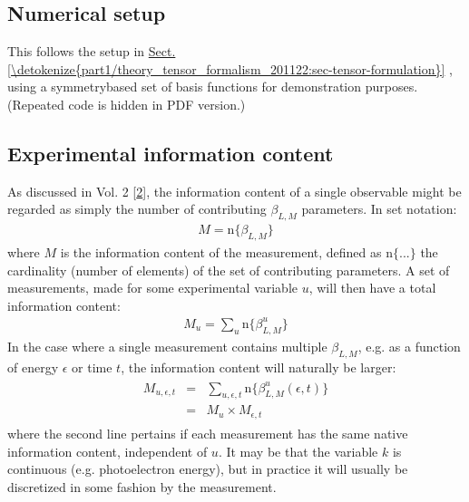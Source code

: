 \documentclass[letterpaper,table,10pt,english]{jupyterBook}
\begin{document}
\subsection{Numerical setup}
\label{\detokenize{part1/theory_info_content_221122:numerical-setup}}
\sphinxAtStartPar
This follows the setup in \hyperref[\detokenize{part1/theory_tensor_formalism_201122:sec-tensor-formulation}]{Sect.\@ \ref{\detokenize{part1/theory_tensor_formalism_201122:sec-tensor-formulation}}} {\hyperref[\detokenize{part1/theory_tensor_formalism_201122:sec-tensor-formulation}]{}}, using a symmetry\sphinxhyphen{}based set of basis functions for demonstration purposes. (Repeated code is hidden in PDF version.)


\subsection{Experimental information content}
\label{\detokenize{part1/theory_info_content_221122:experimental-information-content}}\label{\detokenize{part1/theory_info_content_221122:sec-expt-info-content}}
\sphinxAtStartPar
As discussed in  Vol. 2 {[}\hyperlink{cite.backmatter/bibliography:id614}{2}{]}, the information content of a single observable might be regarded as simply the number of contributing \(\beta_{L,M}\) parameters. In set notation:
\begin{equation}\label{equation:part1/theory_info_content_221122:eq:BLM-set}
\begin{split}M=\mathrm{n}\{\beta_{L,M}\}\end{split}
\end{equation}
\sphinxAtStartPar
where \(M\) is the information content of the measurement, defined as
\(\mathrm{n}\{...\}\) the cardinality (number of elements) of the set of
contributing parameters. A set of measurements, made for some
experimental variable \(u\), will then have a total information content:
\begin{equation*}
\begin{split}M_{u}=\sum_{u}\mathrm{n}\{\beta_{L,M}^{u}\}\end{split}
\end{equation*}
\sphinxAtStartPar
In the case where a single measurement contains multiple \(\beta_{L,M}\),
e.g. as a function of energy \(\epsilon\) or time \(t\), the information
content will naturally be larger:
\begin{equation*}
\begin{split}\begin{aligned}
M_{u,\epsilon,t} & = & \sum_{u,\epsilon,t}\mathrm{n}\{\beta_{L,M}^{u}(\epsilon,t)\}\\
 & = & M_{u}\times M_{\epsilon,t}\end{aligned}\end{split}
\end{equation*}
\sphinxAtStartPar
where the second line pertains if each measurement has the same native
information content, independent of \(u\). It may be that the variable \(k\)
is continuous (e.g. photoelectron energy), but in practice it will
usually be discretized in some fashion by the measurement.
\end{document}
